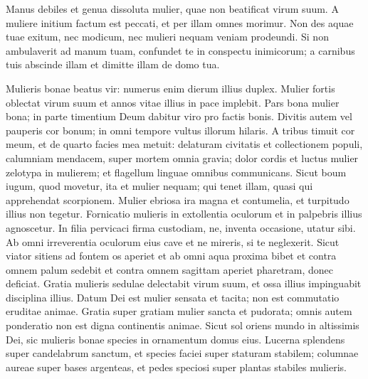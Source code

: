 \begin{biblechapter}
\begin{biblechapter}
\begin{biblechapter}
\begin{biblechapter}
\begin{biblechapter}
\begin{biblechapter}
\begin{biblechapter}
\begin{biblechapter}
\begin{biblechapter}
\begin{biblechapter}
\begin{biblechapter}
\begin{biblechapter}
\begin{biblechapter}
\begin{biblechapter}
\begin{biblechapter}
\begin{biblechapter}
\begin{biblechapter}
\begin{biblechapter}
\begin{biblechapter}
\begin{biblechapter}
\begin{biblechapter}
\begin{biblechapter}
\begin{biblechapter}
\begin{biblechapter}
\begin{biblechapter}
 \verse Manus debiles et genua dissoluta
 mulier, quae non beatificat virum suum.
 \verse A muliere initium factum est peccati,
 et per illam omnes morimur.
 \verse Non des aquae tuae exitum, nec modicum,
 nec mulieri nequam veniam prodeundi.
 \verse Si non ambulaverit ad manum tuam,
 confundet te in conspectu inimicorum;
 \verse a carnibus tuis abscinde illam
 et dimitte illam de domo tua.
 
\begin{biblechapter}
\verse Mulieris bonae beatus vir:
 numerus enim dierum illius duplex.
 \verse Mulier fortis oblectat virum suum
 et annos vitae illius in pace implebit.
 \verse Pars bona mulier bona;
 in parte timentium Deum dabitur viro pro factis bonis.
 \verse Divitis autem vel pauperis cor bonum;
 in omni tempore vultus illorum hilaris.
 \verse A tribus timuit cor meum,
 et de quarto facies mea metuit:
 \verse delaturam civitatis et collectionem populi,
 \verse calumniam mendacem, super mortem omnia gravia;
 \verse dolor cordis et luctus mulier zelotypa in mulierem;
 \verse et flagellum linguae omnibus communicans.
 \verse Sicut boum iugum, quod movetur, ita et mulier nequam;
 qui tenet illam, quasi qui apprehendat scorpionem.
 \verse Mulier ebriosa ira magna et contumelia,
 et turpitudo illius non tegetur.
 \verse Fornicatio mulieris in extollentia oculorum
 et in palpebris illius agnoscetur.
 \verse In filia pervicaci firma custodiam,
 ne, inventa occasione, utatur sibi.
 \verse Ab omni irreverentia oculorum eius cave
 et ne mireris, si te neglexerit.
 \verse Sicut viator sitiens ad fontem os aperiet
 et ab omni aqua proxima bibet
 et contra omnem palum sedebit
 et contra omnem sagittam aperiet pharetram, donec deficiat.
 \verse Gratia mulieris sedulae delectabit virum suum,
 et ossa illius impinguabit 
\verse disciplina illius.
 Datum Dei est 
\verse mulier sensata et tacita;
 non est commutatio eruditae animae.
 \verse Gratia super gratiam mulier sancta et pudorata;
 \verse omnis autem ponderatio non est digna continentis animae.
 \verse Sicut sol oriens mundo in altissimis Dei,
 sic mulieris bonae species in ornamentum domus eius.
 \verse Lucerna splendens super candelabrum sanctum,
 et species faciei super staturam stabilem;
 \verse columnae aureae super bases argenteas,
 et pedes speciosi super plantas stabiles mulieris.

\end{biblechapter}
\end{biblechapter}
\end{biblechapter}
\end{biblechapter}
\end{biblechapter}
\end{biblechapter}
\end{biblechapter}
\end{biblechapter}
\end{biblechapter}
\end{biblechapter}
\end{biblechapter}
\end{biblechapter}
\end{biblechapter}
\end{biblechapter}
\end{biblechapter}
\end{biblechapter}
\end{biblechapter}
\end{biblechapter}
\end{biblechapter}
\end{biblechapter}
\end{biblechapter}
\end{biblechapter}
\end{biblechapter}
\end{biblechapter}
\end{biblechapter}
\end{biblechapter}
